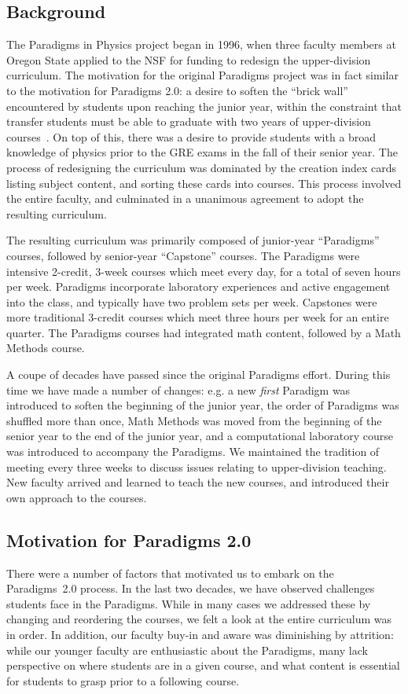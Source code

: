 \documentclass[english,aps,pra,reprint,noshowpacs,superscriptaddress]{revtex4-1}
\begin{document}
\subsection{Background}
The Paradigms in Physics project began in 1996, when three faculty
members at Oregon State applied to the NSF for funding to redesign the
upper-division curriculum.  The motivation for the original Paradigms
project was in fact similar to the motivation for Paradigms 2.0: a
desire to soften the ``brick wall'' encountered by students upon
reaching the junior year, within the constraint that transfer students
must be able to graduate with two years of upper-division
courses~\cite{manogue2001paradigms}.  On top of this, there was a
desire to provide students with a broad knowledge of physics prior to
the GRE exams in the fall of their senior year.  The process of
redesigning the curriculum was dominated by the creation index cards
listing subject content, and sorting these cards into courses.  This
process involved the entire faculty, and culminated in a unanimous
agreement to adopt the resulting curriculum.

The resulting curriculum was primarily composed of junior-year
``Paradigms'' courses, followed by senior-year ``Capstone'' courses.
The Paradigms were intensive 2-credit, 3-week courses which meet every
day, for a total of seven hours per week.  Paradigms incorporate
laboratory experiences and active engagement into the class, and
typically have two problem sets per week.  Capstones were more
traditional 3-credit courses which meet three hours per week for an
entire quarter.  The Paradigms courses had integrated math content,
followed by a Math Methods course.

A coupe of decades have passed since the original Paradigms effort.
During this time we have made a number of changes: e.g. a new
\emph{first} Paradigm was introduced to soften the beginning of the
junior year, the order of Paradigms was shuffled more than once, Math
Methods was moved from the beginning of the senior year to the end of
the junior year, and a computational laboratory course was introduced
to accompany the Paradigms.  We maintained the tradition of meeting
every three weeks to discuss issues relating to upper-division
teaching.  New faculty arrived and learned to teach the new courses,
and introduced their own approach to the courses.

\subsection{Motivation for Paradigms 2.0}
There were a number of factors that motivated us to embark on the
Paradigms~2.0 process.  In the last two decades, we have observed
challenges students face in the Paradigms.  While in many cases we
addressed these by changing and reordering the courses, we felt a look
at the entire curriculum was in order.  In addition, our faculty
buy-in and aware was diminishing by attrition: while our younger
faculty are enthusiastic about the Paradigms, many lack perspective on
where students are in a given course, and what content is essential
for students to grasp prior to a following course.
\end{document}
